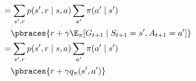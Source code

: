 \begin{solution}
\begin{align*}
{            } \\
    & =
    \sum_{s^\prime, r}
        p(s^\prime, r \mid s, a)
        \sum_{a^\prime}
            \pi(a^\prime \mid s^\prime) \\ & \quad
            \pbraces
            {
                r
                +
                \gamma 
                \E_\pi[G_{t+1} \mid S_{t+1} = s^\prime, A_{t+1} = a^\prime]
            } \\
    & =
    \sum_{s^\prime, r}
        p(s^\prime, r \mid s, a)
        \sum_{a^\prime}
            \pi(a^\prime \mid s^\prime) \\ & \quad
            \pbraces
            {
                r
                +
                \gamma
                q_\pi(s^\prime, a^\prime)
            }
\end{align*}

\end{solution}

